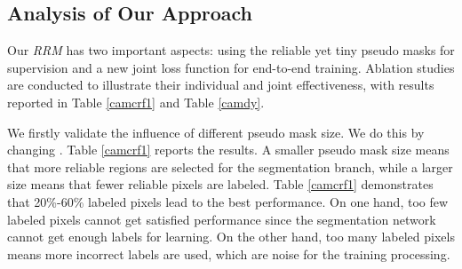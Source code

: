 \documentclass[letterpaper]{article} \usepackage{aaai20}  \usepackage{times}  \usepackage{helvet} \usepackage{courier}  \usepackage[hyphens]{url}  \usepackage{graphicx} \urlstyle{rm} \def\UrlFont{\rm}  \usepackage{graphicx}  \frenchspacing  \setlength{\pdfpagewidth}{8.5in}  \setlength{\pdfpageheight}{11in}
\begin{document}
\subsection{Analysis of Our Approach}


Our \emph{RRM} has two important aspects: using the reliable yet tiny pseudo masks for supervision and a new joint loss function for end-to-end training. Ablation studies are conducted to illustrate their individual and joint effectiveness, with results reported in Table \ref{camcrf1} and Table \ref{camdy}.

\begin{table}[!htb]
	\centering
	\caption{Performance on PASCAL VOC 2012 \emph{val} set based on different mined region. Ratio means the proportion of reliable regions which is mined by our method to the whole pixels. "CE loss" means only cross entropy loss was used for our segmentation branch and "Joint loss" means our dense energy loss was combined with cross entropy loss was used for the segmentation branch. }\label{camcrf1}

\end{table}

We firstly validate the influence of different pseudo mask size. We do this by changing . Table \ref{camcrf1} reports the results. A smaller pseudo mask size means that more reliable regions are selected for the segmentation branch, while a larger size means that fewer reliable pixels are labeled. Table \ref{camcrf1} demonstrates that 20\%-60\% labeled pixels lead to the best performance. On one hand, too few labeled pixels cannot get satisfied performance since the segmentation network cannot get enough labels for learning. On the other hand, too many labeled pixels means more incorrect labels are used, which are noise for the training processing.

 \begin{table}[!htb]
 	\centering
 	\caption{Analysis of our method. CAM means class activate maps directly as pseudo masks. Ours-\emph{RRM} means that we used our method to produce pseudo masks. Both CAM and ours-\emph{RRM} use top 40\% pixels according to Table \ref{camcrf1}.}	\label{camdy}
 \end{table}
 
\end{document}
